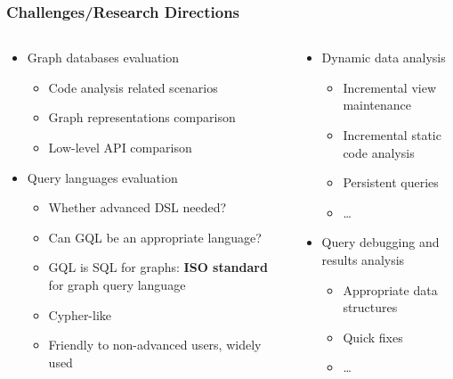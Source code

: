 \documentclass[xcolor=table,aspectratio=169]{beamer}
\begin{document}
\begin{frame}[fragile]
  \frametitle{Challenges/Research Directions}  
  \begin{columns}[t]
    \begin{column}{0.5\textwidth}
  \begin{itemize}
    \item Graph databases evaluation
    \begin{itemize}
      \item Code analysis related scenarios
      \item Graph representations comparison
      \item Low-level API comparison  
    \end{itemize}
    \pause
    \item Query languages evaluation
    \begin{itemize}
      \pause
      \item Whether advanced DSL needed?
      \pause
      \item Can GQL be an appropriate language?
      \item GQL is SQL for graphs: \textbf{ISO standard} for graph query language
      \item Cypher-like 
      \item Friendly to non-advanced users, widely used
    \end{itemize}
  \end{itemize}  
 \end{column}
 \pause
\begin{column}{0.5\textwidth}
  \begin{itemize}
    \item Dynamic data analysis
    \begin{itemize}
      \item Incremental view maintenance
      \item Incremental static code analysis
      \item Persistent queries
      \item \ldots
    \end{itemize}
    \pause
    \item Query debugging and results analysis 
    \begin{itemize}
      \item Appropriate data structures
      \item Quick fixes
      \item \ldots
    \end{itemize}
  \end{itemize}
\end{column}
\end{columns}
\end{frame}
\end{document}
